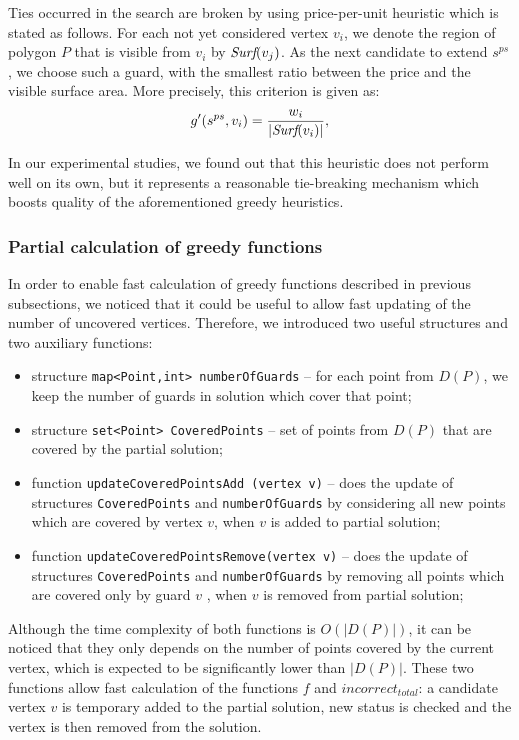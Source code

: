 \documentclass[runningheads,a4paper]{elsarticle}
\begin{document}
	
	Ties occurred in the search are broken by using  price-per-unit heuristic which is stated as follows.
	For each not yet considered vertex $v_i$, we denote the region of polygon $P$ that is visible from $v_i$ by $\emph{Surf}(v_j)$. As the next candidate to extend $s^{ps}$, we choose such a guard,  with the smallest ratio between the price and the visible surface area. More precisely, this  criterion is given as:
	\begin{align}
	g'(s^{ps}, v_i) = \frac{w_{i}}{|\emph{Surf}({v_i})|},
	\end{align}

	In our experimental studies, we found out that this heuristic does not perform well on its own, but it represents a reasonable tie-breaking mechanism which boosts quality of the aforementioned greedy heuristics.
	\subsubsection{Partial calculation of greedy functions}
	
	In order to enable fast calculation of greedy functions described in previous subsections, we noticed that it could be useful to allow fast updating of the number of uncovered vertices. Therefore, we introduced two useful structures and two auxiliary functions:
	\begin{itemize}
		\item structure \texttt{map<Point,int> numberOfGuards} -- for each point from $D(P)$,  we keep the number of guards in solution which cover that point;
		\item structure \texttt{set<Point> CoveredPoints} -- set of points from $D(P)$ that are covered by the partial solution;
		\item function \texttt{updateCoveredPointsAdd (vertex v)} -- does the update of  structures \texttt{CoveredPoints} and \texttt{numberOfGuards} by considering all new points which are covered by vertex $v$, when $v$  is added to partial solution; %
		\item function \texttt{updateCoveredPointsRemove(vertex v)} -- does the update of structures \texttt{CoveredPoints} and \texttt{numberOfGuards} by removing all points which are covered only by guard $v$ , when $v$ is removed from partial solution; %
	\end{itemize}
 Although the time complexity of both functions is $O(|D(P)|)$, %
  it can be noticed that they only depends on the number of points covered by the current vertex, which is expected to be significantly lower than $|D(P)|$. These two functions allow fast calculation of the functions $f$ and  $incorrect_{total}$: a candidate vertex $v$ is temporary added to the partial solution, new status is checked and the vertex is then removed from the solution.
 
\end{document}
